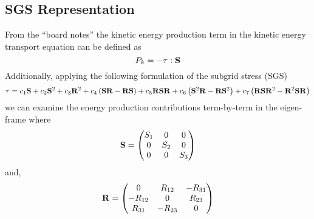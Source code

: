 \subsection{SGS Representation}
From the ``board notes'' the kinetic energy production term in the kinetic
energy transport equation can be defined as
\begin{equation}
    P_{k} =  - \mathbf{\tau}:\mathbf{S}
\end{equation}
Additionally, applying the following  formulation of the subgrid stress
(SGS) 
\begin{equation}
    \mathbf{\tau} = c_{1} \mathbf{S} + c_{2} \mathbf{S}^2 + c_{3} \mathbf{R}^2
                + c_{4} \left(\mathbf{S} \mathbf{R} - \mathbf{R} \mathbf{S} \right)
                + c_{5} \mathbf{R} \mathbf{S} \mathbf{R} 
                + c_{6} \left(\mathbf{S}^2 \mathbf{R} - \mathbf{R} \mathbf{S}^2 \right)
                + c_{7} \left( \mathbf{R} \mathbf{S} \mathbf{R}^2 - \mathbf{R}^2 \mathbf{S} \mathbf{R} \right) 
                \label{eq:SGS-tf-8}
\end{equation}
we can examine the energy production contributions term-by-term in the 
eigen-frame where
\begin{equation}
    \mathbf{S} =
    \begin{pmatrix}
        S_{1}      & 0         & 0         \\
        0           & S_{2}    & 0         \\
        0           & 0         & S_{3}    \\
    \end{pmatrix}
    \label{eq:Sij}
\end{equation}
and,
\begin{equation}
    \mathbf{R} =
    \begin{pmatrix}
        0           & R_{12}    & -R_{31}   \\
        -R_{12}     & 0         & R_{23}    \\
        R_{31}      & -R_{23}   & 0         \\
    \end{pmatrix}
\end{equation}









